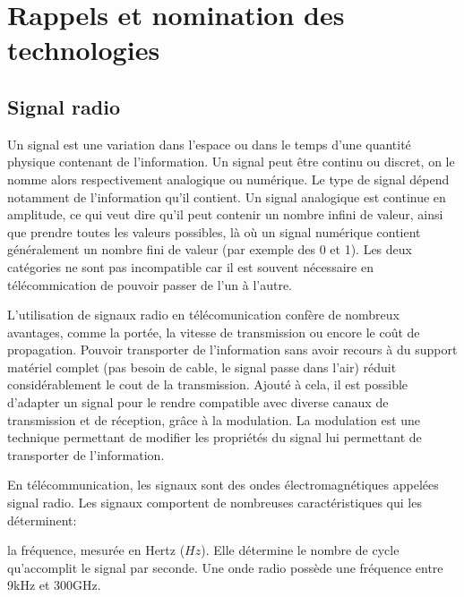\renewcommand{\leftmark}{NOMINATION DES TECHNOLOGIES}


\chapter{Rappels et nomination des technologies}\label{chap1}

\section{Signal radio}

Un signal est une variation dans l'espace ou dans le temps d'une quantité physique contenant de l'information. Un signal peut être continu ou discret, on le nomme alors respectivement analogique ou numérique. Le type de signal dépend notamment de l'information qu'il contient. Un signal analogique est continue en amplitude, ce qui veut dire qu'il peut contenir un nombre infini de valeur, ainsi que prendre toutes les valeurs possibles, là où un signal numérique contient généralement un nombre fini de valeur (par exemple des 0 et 1).
Les deux catégories ne sont pas incompatible car il est souvent nécessaire en télécommication de pouvoir passer de l'un à l'autre.

\vspace{0.1cm}

L'utilisation de signaux radio en télécomunication confère de nombreux avantages, comme la portée, la vitesse de transmission  ou encore le coût de propagation. Pouvoir transporter de l'information sans avoir recours à du support matériel complet (pas besoin de cable, le signal passe dans l'air) réduit\\ considérablement le cout de la transmission. Ajouté à cela, il est possible d'adapter un signal pour le rendre compatible avec diverse canaux de transmission et de réception, grâce à la modulation. La modulation est une technique permettant de modifier les propriétés du signal lui permettant de transporter de l'information.

\newpage

En télécommunication, les signaux sont des ondes électromagnétiques appelées signal radio. Les signaux comportent de nombreuses caractéristiques qui les déterminent: 

\vspace{0.1cm}



la fréquence, mesurée en Hertz ($Hz$). Elle détermine le nombre de cycle qu'accomplit le signal par seconde. Une onde radio possède une fréquence entre 9kHz et 300GHz.

